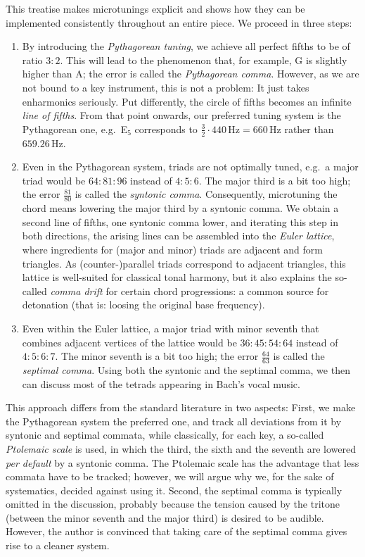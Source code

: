 \documentclass[british,11pt]{scrartcl}
\begin{document}
This treatise makes microtunings explicit and shows how they can be implemented
consistently throughout an entire piece. We proceed in three steps:

\begin{enumerate}
\item By introducing the \emph{Pythagorean tuning}, we achieve all perfect
  fifths to be of ratio $3:2$. This will lead to the phenomenon that, for
  example, \sharp G is slightly higher than \flat A; the error is called
  the \emph{Pythagorean comma}. However, as we are not bound to a key
  instrument, this is not a problem: It just takes enharmonics seriously. Put
  differently, the circle of fifths becomes an infinite \emph{line of
    fifths}. From that point onwards, our preferred tuning system is the
  Pythagorean one, e.g.\ E$_5$ corresponds to
  $\frac32\cdot 440\,\text{Hz}=660\,\text{Hz}$ rather than
  $659.26\,\text{Hz}$.
\item Even in the Pythagorean system, triads are not optimally tuned, e.g.\ a
  major triad would be $64:81:96$ instead of $4:5:6$. The major third is a bit
  too high; the error $\frac{81}{80}$ is called the \emph{syntonic comma}.
  Consequently, microtuning the chord means lowering the major third by a
  syntonic comma.  We obtain a second line of fifths, one syntonic comma lower,
  and iterating this step in both directions, the arising lines can be assembled
  into the \emph{Euler lattice}, where ingredients for (major and minor) triads
  are adjacent and form triangles. As (counter-)parallel triads correspond to
  adjacent triangles, this lattice is well-suited for classical tonal harmony,
  but it also explains the so-called \emph{comma drift} for certain chord
  progressions: a common source for detonation (that is: loosing the original
  base frequency).
\item {} Even within the Euler lattice, a major triad with
  minor seventh that combines adjacent vertices of the lattice would be
  $36:45:54:64$ instead of $4:5:6:7$. The minor seventh is a bit too high; the
  error $\frac{64}{63}$ is called the \emph{septimal comma}. Using both the
  syntonic and the septimal comma, we then can discuss most of the tetrads
  appearing in Bach’s vocal music.
\end{enumerate}
This approach differs from the standard literature in two aspects:
First, we make the Pythagorean system the preferred one, and track all
deviations from it by syntonic and septimal commata, while classically, for each
key, a so-called \emph{Ptolemaic scale} is used, in which the third, the sixth
and the seventh are lowered \emph{per default} by a syntonic comma. The
Ptolemaic scale has the advantage that less commata have to be tracked; however,
we will argue why we, for the sake of systematics, decided against using
it. Second, the septimal comma is typically omitted in the discussion, probably
because the tension caused by the tritone (between the minor seventh and the
major third) is desired to be audible. However, the author is convinced that
taking care of the septimal comma gives rise to a cleaner system.
\end{document}

